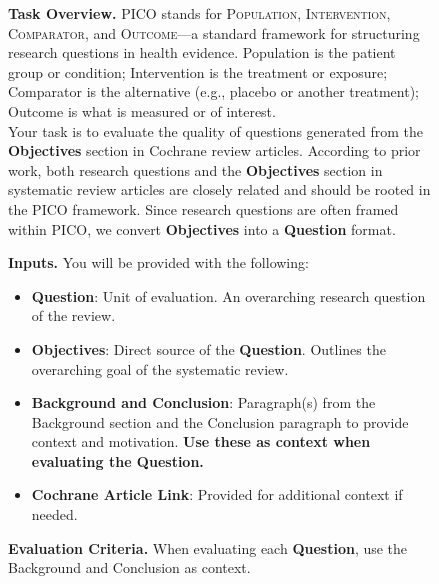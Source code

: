 \documentclass{article}
\begin{document}
\begin{figure}[h!]
\centering
\begin{small}
\begin{tcolorbox}[colback=gray!5, colframe=black, width=\textwidth, title=\textbf{Annotation Guideline for Evaluating Generated Questions}, fonttitle=\bfseries]

\textbf{Task Overview.}
\textsc{PICO} stands for \textsc{Population}, \textsc{Intervention}, \textsc{Comparator}, and \textsc{Outcome}—a standard framework for structuring research questions in health evidence. Population is the patient group or condition; Intervention is the treatment or exposure; Comparator is the alternative (e.g., placebo or another treatment); Outcome is what is measured or of interest.\\

Your task is to evaluate the quality of questions generated from the \textbf{Objectives} section in Cochrane review articles. According to prior work, both research questions and the \textbf{Objectives} section in systematic review articles are closely related and should be rooted in the PICO framework. Since research questions are often framed within PICO, we convert \textbf{Objectives} into a \textbf{Question} format.

\vspace{0.5em}
\textbf{Inputs.}
You will be provided with the following:

\begin{itemize}[leftmargin=0.6cm]
    \item \textbf{Question}: Unit of evaluation. An overarching research question of the review.
    \item \textbf{Objectives}: Direct source of the \textbf{Question}. Outlines the overarching goal of the systematic review.
    \item \textbf{Background and Conclusion}: Paragraph(s) from the Background section and the Conclusion paragraph to provide context and motivation. \textbf{Use these as context when evaluating the Question.}
    \item \textbf{Cochrane Article Link}: Provided for additional context if needed.
\end{itemize}

\vspace{0.5em}
\textbf{Evaluation Criteria.}
When evaluating each \textbf{Question}, use the Background and Conclusion as context.


\end{tcolorbox}
\end{small}
\end{figure}
\end{document}
